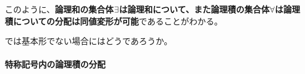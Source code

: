 \documentclass[a4j, 9pt]{ltjsarticle}
\begin{document}
      \blank

      このように、\textbf{論理和の集合体$\displaystyle \exists$は論理和について、また論理積の集合体$\displaystyle \forall$は論理積についての分配は同値変形が可能}であることがわかる。\par
      では基本形でない場合にはどうであろうか。

      \newpage

      \paragraph{特称記号内の論理積の分配}

        \begin{center}
          \begin{table}[h]
            \centering
            \begin{tabular}{llll}
  

\end{tabular}
\end{table}
\end{center}
\end{document}
